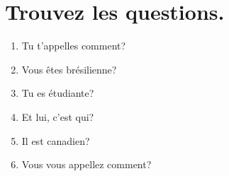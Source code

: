 \section{Trouvez les questions.}
\begin{enumerate}
    \item Tu t'appelles comment?
    \item Vous êtes brésilienne?
    \item Tu es étudiante?
    \item Et lui, c'est qui?
    \item Il est canadien?
    \item Vous vous appellez comment?
\end{enumerate}